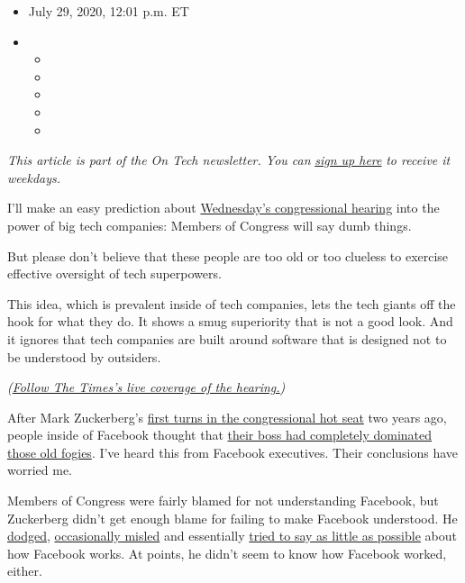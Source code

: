 \begin{itemize}
\item
  July 29, 2020, 12:01 p.m. ET
\item
  \begin{itemize}
  \item
  \item
  \item
  \item
  \item
  \end{itemize}
\end{itemize}

\emph{This article is part of the On Tech newsletter. You can}
\href{https://www.nytimes3xbfgragh.onion/newsletters/signup/OT}{\emph{sign
up here}} \emph{to receive it weekdays.}

I'll make an easy prediction about
\href{https://www.nytimes3xbfgragh.onion/2020/07/28/technology/amazon-apple-facebook-google-antitrust-hearing.html}{Wednesday's
congressional hearing} into the power of big tech companies: Members of
Congress will say dumb things.

But please don't believe that these people are too old or too clueless
to exercise effective oversight of tech superpowers.

This idea, which is prevalent inside of tech companies, lets the tech
giants off the hook for what they do. It shows a smug superiority that
is not a good look. And it ignores that tech companies are built around
software that is designed not to be understood by outsiders.

\emph{(}\href{https://www.nytimes3xbfgragh.onion/live/2020/07/29/technology/tech-ceos-hearing-testimony}{\emph{Follow
The Times's live coverage of the hearing.}}\emph{)}

After Mark Zuckerberg's
\href{https://www.nytimes3xbfgragh.onion/2018/04/12/technology/mark-zuckerberg-testimony.html}{first
turns in the congressional hot seat} two years ago, people inside of
Facebook thought that
\href{https://www.wired.com/story/sigh-of-relief-inside-facebook/}{their
boss had completely dominated those old fogies}. I've heard this from
Facebook executives. Their conclusions have worried me.

Members of Congress were fairly blamed for not understanding Facebook,
but Zuckerberg didn't get enough blame for failing to make Facebook
understood. He
\href{https://www.nytimes3xbfgragh.onion/2018/04/10/technology/zuckerberg-elections-russia-data-privacy.html}{dodged},
\href{https://www.washingtonpost.com/news/fact-checker/wp/2018/04/13/fact-checking-mark-zuckerbergs-testimony-on-facebook-and-data-collection/}{occasionally
misled} and essentially
\href{https://www.bloomberg.com/opinion/articles/2018-04-12/mark-zuckerberg-refuses-to-admit-how-facebook-works}{tried
to say as little as possible} about how Facebook works. At points, he
didn't seem to know how Facebook worked, either.

